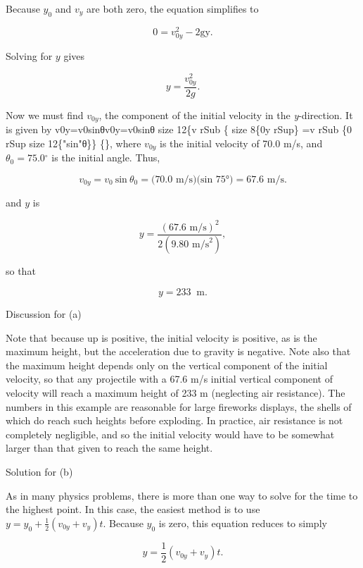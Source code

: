 \documentclass[
]{book}
\begin{document}
Because \(y_{0}{}\) and \(v_{y}{}\) are both zero, the equation simplifies
to

\leavevmode{}%
\[{{0 = {v_{0y}^{2} - 2}}\text{gy.}}{}\]

Solving for \(y{}\) gives

\leavevmode{}%
\[{{y = \frac{v_{0y}^{2}}{2g}}\text{.}}{}\]

Now we must find \(v_{0y}{}\), the component of the initial velocity in
the \emph{y}-direction. It is given by {v0y=v0sinθv0y=v0sinθ size 12\{v rSub \{
size 8\{0y rSup\} =v rSub \{0 rSup size 12\{"sin"θ\}\} \{\}}, where
\(v_{0y}{}\) is the initial velocity of 70.0 m/s, and
\({\theta_{0} = 75.0{^\circ}}{}\) is the initial angle. Thus,

\leavevmode{}%
\[{{v_{0y} = v_{0}}\ \text{sin}\ {\theta_{0} = (}\text{70.0\ m/s})(\text{sin\ 75°}{) = \text{67.6\ m/s.}}}{}\]

and \(y{}\) is

\leavevmode{}%
\[{y = \frac{(\text{67}\text{.6\ m/s})^{2}}{2(9\text{.}\text{80\ m}\text{/s}^{2})}},\]

so that

\leavevmode{}%
\[{{y = \text{233}}\operatorname{}\text{m.}}{}\]

{Discussion for (a)}

Note that because up is positive, the initial velocity is positive, as
is the maximum height, but the acceleration due to gravity is negative.
Note also that the maximum height depends only on the vertical component
of the initial velocity, so that any projectile with a 67.6 m/s initial
vertical component of velocity will reach a maximum height of 233 m
(neglecting air resistance). The numbers in this example are reasonable
for large fireworks displays, the shells of which do reach such heights
before exploding. In practice, air resistance is not completely
negligible, and so the initial velocity would have to be somewhat larger
than that given to reach the same height.

{Solution for (b)}

As in many physics problems, there is more than one way to solve for the
time to the highest point. In this case, the easiest method is to use
\({{y = {y_{0} + \frac{1}{2}}}({v_{0y} + v_{y}})t}{}\). Because \(y_{0}{}\)
is zero, this equation reduces to simply

\leavevmode{}%
\[{{y = \frac{1}{2}}({v_{0y} + v_{y}})t}\text{.}{}\]
\end{document}
